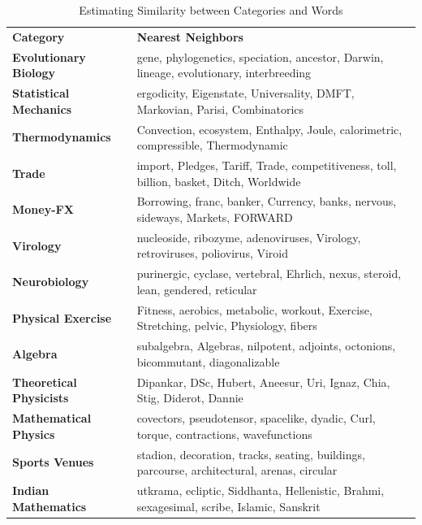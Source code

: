 \begin{table}[h!]
\tabcolsep=1mm
\footnotesize
\begin{center}
\begin{adjustwidth}{-1.5cm}{}
\begin{tabular}{l@{\hskip3mm} l}
\toprule
\multirow{2}{*}{\textbf{Category}} & \multirow{2}{*}{\textbf{Nearest Neighbors}} \\
 & \\
\textbf{Evolutionary Biology}   & gene, phylogenetics, speciation, ancestor, Darwin, lineage, evolutionary, interbreeding \\
\textbf{Statistical Mechanics}  & ergodicity, Eigenstate, Universality, DMFT, Markovian, Parisi, Combinatorics \\
\textbf{Thermodynamics}         & Convection, ecosystem, Enthalpy, Joule, calorimetric, compressible, Thermodynamic \\
\textbf{Trade}                  & import, Pledges, Tariff, Trade, competitiveness, toll, billion, basket, Ditch, Worldwide \\
\textbf{Money-FX}               & Borrowing, franc, banker, Currency, banks, nervous, sideways, Markets, FORWARD \\
\textbf{Virology}               & nucleoside, ribozyme, adenoviruses, Virology, retroviruses, poliovirus, Viroid \\
\textbf{Neurobiology}           & purinergic, cyclase, vertebral, Ehrlich, nexus, steroid, lean, gendered, reticular \\
\textbf{Physical Exercise}      & Fitness, aerobics, metabolic, workout, Exercise, Stretching, pelvic, Physiology, fibers \\
\textbf{Algebra}                & subalgebra, Algebras, nilpotent, adjoints, octonions, bicommutant, diagonalizable \\
\textbf{Theoretical Physicists} & Dipankar, DSc, Hubert, Aneesur, Uri, Ignaz, Chia, Stig, Diderot, Dannie \\
\textbf{Mathematical Physics}   & covectors, pseudotensor, spacelike, dyadic, Curl, torque, contractions, wavefunctions \\
\textbf{Sports Venues}          & stadion, decoration, tracks, seating, buildings, parcourse, architectural, arenas, circular \\
\textbf{Indian Mathematics}     & utkrama, ecliptic, Siddhanta, Hellenistic, Brahmi, sexagesimal, scribe, Islamic, Sanskrit \\
\bottomrule         
\end{tabular}
 \end{adjustwidth}
\end{center}
\caption{\label{catword:sim} Estimating Similarity between Categories and Words}
\end{table}